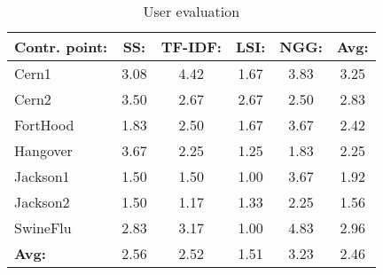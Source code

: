 \begin{table*}[htbp]
\centering
\begin{tabular}{lccccc}

\textbf{Contr. point:} & \textbf{SS:} & \textbf{TF-IDF:} & \textbf{LSI:} & \textbf{NGG:} & \textbf{Avg:} \\
\hline
Cern1 & 3.08 & 4.42 & 1.67 & 3.83 & 3.25 \\
Cern2 & 3.50 & 2.67 & 2.67 & 2.50 & 2.83 \\
FortHood & 1.83 & 2.50 & 1.67 & 3.67 & 2.42 \\
Hangover & 3.67 & 2.25 & 1.25 & 1.83 & 2.25 \\
Jackson1 & 1.50 & 1.50 & 1.00 & 3.67 & 1.92 \\
Jackson2 & 1.50 & 1.17 & 1.33 & 2.25 & 1.56 \\
SwineFlu & 2.83 & 3.17 & 1.00 & 4.83 & 2.96 \\
\hline
\textbf{Avg:} & 2.56 & 2.52 & 1.51 & 3.23 & 2.46 \\
\hline
\end{tabular}
\caption{User evaluation}
\label{tab:UserEvaluation}
\end{table*}
